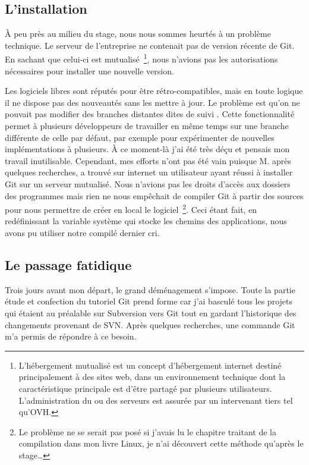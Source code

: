 \subsection{L'installation} %

À peu près au milieu du stage, nous nous sommes heurtés à un problème
technique. Le serveur de l'entreprise ne contenait pas de version récente de
Git. En sachant que celui-ci est mutualisé\, \footnote{L'hébergement mutualisé
est un concept d'hébergement internet destiné principalement à des sites web,
dans un environnement technique dont la caractéristique principale est d'être
partagé par plusieurs utilisateurs. L'administration du ou des serveurs est
assurée par un intervenant tiers tel qu'OVH.}, nous n'avions pas les
autorisations nécessaires pour installer une nouvelle version.

Les logiciels libres sont réputés pour être rétro-compatibles, mais en toute
logique il ne dispose pas des nouveautés sans les mettre à jour. Le problème
est qu'on ne pouvait pas modifier des branches distantes dites \og de suivi
\fg{}. Cette fonctionnalité permet à plusieurs développeurs de travailler en
même temps sur une branche différente de celle par défaut, par exemple pour
expérimenter de nouvelles implémentations à plusieurs. À ce moment-là j'ai été
très déçu et pensais mon travail inutilisable. Cependant, mes efforts n'ont pas
été vain puisque M. après quelques recherches, a trouvé sur
internet un utilisateur ayant réussi à installer Git sur un serveur mutualisé.
Nous n'avions pas les droits d'accès aux dossiers des programmes mais rien ne
nous empêchait de compiler Git à partir des sources pour nous permettre de
créer en local le logiciel\, \footnote{Le problème ne se serait pas posé si
j'avais lu le chapitre traitant de la compilation dans mon livre Linux, je n'ai
découvert cette méthode qu'après le stage\dots}. Ceci étant fait, en
redéfinissant la variable système qui stocke les chemins des applications, nous
avons pu utiliser notre compilé dernier cri.


\subsection{Le passage fatidique} %

Trois jours avant mon départ, le grand déménagement s'impose. Toute la partie
étude et confection du tutoriel Git prend forme car j'ai basculé tous les
projets qui étaient au préalable sur Subversion vers Git tout en gardant
l'historique des changements provenant de SVN. Après quelques recherches, une
commande Git m'a permis de répondre à ce besoin.\\


